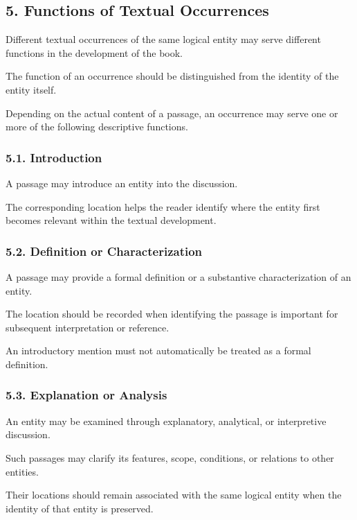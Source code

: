 
\subsection*{5. Functions of Textual Occurrences}

Different textual occurrences
of the same logical entity may
serve different functions in
the development of the book.

The function of an occurrence
should be distinguished from
the identity of the entity itself.

Depending on the actual content
of a passage, an occurrence may
serve one or more of the following
descriptive functions.

\subsubsection*{5.1. Introduction}

A passage may introduce an entity
into the discussion.

The corresponding location helps
the reader identify where the
entity first becomes relevant
within the textual development.

\subsubsection*{5.2. Definition or Characterization}

A passage may provide a formal
definition or a substantive
characterization of an entity.

The location should be recorded
when identifying the passage
is important for subsequent
interpretation or reference.

An introductory mention must
not automatically be treated
as a formal definition.

\subsubsection*{5.3. Explanation or Analysis}

An entity may be examined through
explanatory, analytical, or
interpretive discussion.

Such passages may clarify its
features, scope, conditions,
or relations to other entities.

Their locations should remain
associated with the same logical
entity when the identity of
that entity is preserved.

